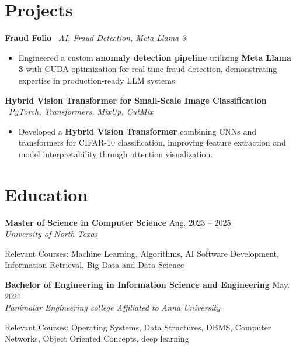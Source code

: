 \documentclass[11pt,a4paper]{article}
\newcommand{\jobentry}[3]{%
  \vspace{5pt}%
  \noindent\textbf{#1} \hfill #3\\%
  \textit{#2}%
}
\begin{document}
\section*{Projects}

\noindent\textbf{Fraud Folio} \textbar\ \textit{AI, Fraud Detection, Meta Llama 3} \hfill \href{https://github.com/abinesha312/hack_unt_financial_fraud.git}{\faExternalLink}
\begin{itemize}
\item Engineered a custom \textbf{anomaly detection pipeline} utilizing \textbf{Meta Llama 3} with CUDA optimization for real-time fraud detection, demonstrating expertise in production-ready LLM systems.
\end{itemize}

\vspace{4pt}
\noindent\textbf{Hybrid Vision Transformer for Small-Scale Image Classification} \textbar\ \textit{PyTorch, Transformers, MixUp, CutMix} \hfill \href{https://github.com/abinesha312/vision-transformer-cifar}{\faExternalLink}
\begin{itemize}
\item Developed a \textbf{Hybrid Vision Transformer} combining CNNs and transformers for CIFAR-10 classification, improving feature extraction and model interpretability through attention visualization.
\end{itemize}

\section*{Education}

\jobentry{Master of Science in Computer Science}{University of North Texas}{Aug. 2023 -- 2025}
Relevant Courses: Machine Learning, Algorithms, AI Software Development, Information Retrieval, Big Data and Data Science

\jobentry{Bachelor of Engineering in Information Science and Engineering}{Panimalar Engineering college Affiliated to Anna University}{May. 2021}
Relevant Courses: Operating Systems, Data Structures, DBMS, Computer Networks, Object Oriented Concepts, deep learning
\end{document}
